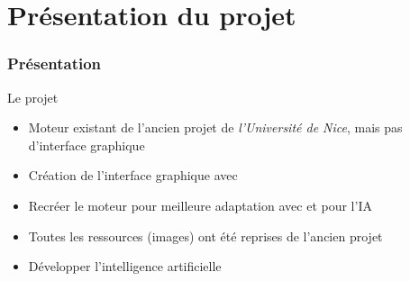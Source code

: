 \section{Présentation du projet}
	\begin{frame}
	\frametitle{Présentation}
	\begin{block}{Le projet}
		\begin{itemize}
			\item Moteur existant de l'ancien projet de \emph{l'Université de Nice}, mais pas d'interface graphique
			\item Création de l'interface graphique avec \fx
			\item Recréer le moteur pour meilleure adaptation avec \fx et pour l'IA
			\item Toutes les ressources (images) ont été reprises de l'ancien projet
			\item Développer l'intelligence artificielle
		\end{itemize}
	\end{block} 
\end{frame}